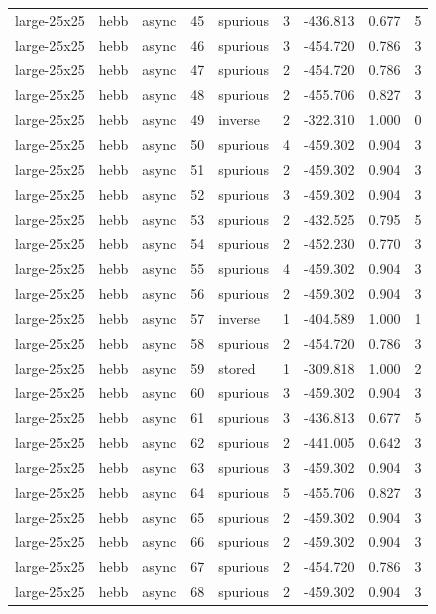 \begin{tabular}{lllrlrrrr}
large-25x25 & hebb & async & 45 & spurious & 3 & -436.813 & 0.677 & 5 \\
large-25x25 & hebb & async & 46 & spurious & 3 & -454.720 & 0.786 & 3 \\
large-25x25 & hebb & async & 47 & spurious & 2 & -454.720 & 0.786 & 3 \\
large-25x25 & hebb & async & 48 & spurious & 2 & -455.706 & 0.827 & 3 \\
large-25x25 & hebb & async & 49 & inverse & 2 & -322.310 & 1.000 & 0 \\
large-25x25 & hebb & async & 50 & spurious & 4 & -459.302 & 0.904 & 3 \\
large-25x25 & hebb & async & 51 & spurious & 2 & -459.302 & 0.904 & 3 \\
large-25x25 & hebb & async & 52 & spurious & 3 & -459.302 & 0.904 & 3 \\
large-25x25 & hebb & async & 53 & spurious & 2 & -432.525 & 0.795 & 5 \\
large-25x25 & hebb & async & 54 & spurious & 2 & -452.230 & 0.770 & 3 \\
large-25x25 & hebb & async & 55 & spurious & 4 & -459.302 & 0.904 & 3 \\
large-25x25 & hebb & async & 56 & spurious & 2 & -459.302 & 0.904 & 3 \\
large-25x25 & hebb & async & 57 & inverse & 1 & -404.589 & 1.000 & 1 \\
large-25x25 & hebb & async & 58 & spurious & 2 & -454.720 & 0.786 & 3 \\
large-25x25 & hebb & async & 59 & stored & 1 & -309.818 & 1.000 & 2 \\
large-25x25 & hebb & async & 60 & spurious & 3 & -459.302 & 0.904 & 3 \\
large-25x25 & hebb & async & 61 & spurious & 3 & -436.813 & 0.677 & 5 \\
large-25x25 & hebb & async & 62 & spurious & 2 & -441.005 & 0.642 & 3 \\
large-25x25 & hebb & async & 63 & spurious & 3 & -459.302 & 0.904 & 3 \\
large-25x25 & hebb & async & 64 & spurious & 5 & -455.706 & 0.827 & 3 \\
large-25x25 & hebb & async & 65 & spurious & 2 & -459.302 & 0.904 & 3 \\
large-25x25 & hebb & async & 66 & spurious & 2 & -459.302 & 0.904 & 3 \\
large-25x25 & hebb & async & 67 & spurious & 2 & -454.720 & 0.786 & 3 \\
large-25x25 & hebb & async & 68 & spurious & 2 & -459.302 & 0.904 & 3 \\

\end{tabular}
